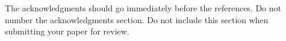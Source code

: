 \documentclass[11pt]{article}
\begin{document}
The acknowledgments should go immediately before the references.  Do
not number the acknowledgments section. Do not include this section
when submitting your paper for review.




%
%
%
%
%
%
%
%
%
\end{document}
